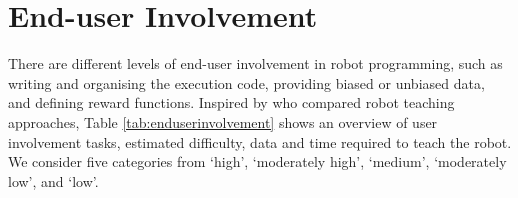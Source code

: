 



\section{End-user Involvement}\label{sssec:End-User Involvement}
There are different levels of end-user involvement in robot programming, such as writing and organising the execution code, providing biased or unbiased data, and defining reward functions. 
Inspired by \cite{kormushev2013reinforcement} who compared robot teaching approaches,
Table \ref{tab:enduserinvolvement} shows an overview of user involvement tasks, estimated difficulty, data and time required to teach the robot.
We consider five categories from `high', `moderately high', `medium', `moderately low', and `low'.


